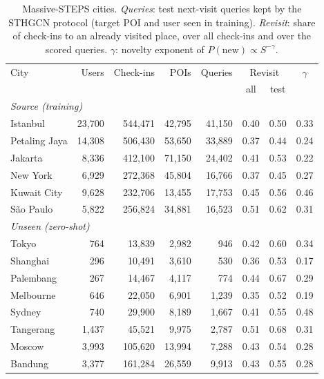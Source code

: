 \begin{table}[t]
\caption{Massive-STEPS cities. \emph{Queries}: test next-visit queries kept by the STHGCN protocol (target POI and user
seen in training). \emph{Revisit}: share of check-ins to an already visited place, over all check-ins and over the
scored queries. $\gamma$: novelty exponent of $P(\text{new})\propto S^{-\gamma}$.}
\label{tab:datasets}
\small\setlength{\tabcolsep}{3.2pt}
\begin{tabular}{lrrrrccc}
\toprule
City & Users & Check-ins & POIs & Queries & \multicolumn{2}{c}{Revisit} & $\gamma$ \\
 & & & & & all & test & \\
\midrule
\multicolumn{8}{l}{\textit{Source (training)}} \\
Istanbul & 23,700 & 544,471 & 42,795 & 41,150 & 0.40 & 0.50 & 0.33 \\
Petaling Jaya & 14,308 & 506,430 & 53,650 & 33,889 & 0.37 & 0.44 & 0.24 \\
Jakarta & 8,336 & 412,100 & 71,150 & 24,402 & 0.41 & 0.53 & 0.22 \\
New York & 6,929 & 272,368 & 45,804 & 16,766 & 0.37 & 0.45 & 0.27 \\
Kuwait City & 9,628 & 232,706 & 13,455 & 17,753 & 0.45 & 0.56 & 0.46 \\
São Paulo & 5,822 & 256,824 & 34,881 & 16,523 & 0.51 & 0.62 & 0.31 \\
\midrule
\multicolumn{8}{l}{\textit{Unseen (zero-shot)}} \\
Tokyo & 764 & 13,839 & 2,982 & 946 & 0.42 & 0.60 & 0.34 \\
Shanghai & 296 & 10,491 & 3,610 & 530 & 0.36 & 0.53 & 0.17 \\
Palembang & 267 & 14,467 & 4,117 & 774 & 0.44 & 0.67 & 0.29 \\
Melbourne & 646 & 22,050 & 6,901 & 1,239 & 0.35 & 0.52 & 0.19 \\
Sydney & 740 & 29,900 & 8,189 & 1,667 & 0.41 & 0.55 & 0.48 \\
Tangerang & 1,437 & 45,521 & 9,975 & 2,787 & 0.51 & 0.68 & 0.31 \\
Moscow & 3,993 & 105,620 & 13,994 & 7,288 & 0.43 & 0.54 & 0.28 \\
Bandung & 3,377 & 161,284 & 26,559 & 9,913 & 0.43 & 0.55 & 0.28 \\
\bottomrule
\end{tabular}
\end{table}
